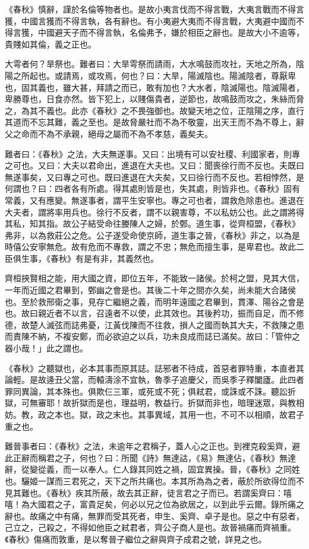 
《春秋》慎辭，謹於名倫等物者也。是故小夷言伐而不得言戰，大夷言戰而不得言獲，中國言獲而不得言執，各有辭也。有小夷避大夷而不得言戰，大夷避中國而不得言獲，中國避天子而不得言執，名倫弗予，嫌於相臣之辭也。是故大小不逾等，貴賤如其倫，義之正也。

大雩者何？旱祭也。難者曰：大旱雩祭而請雨，大水鳴鼓而攻社，天地之所為，陰陽之所起也。或請焉，或攻焉，何也？曰：大旱，陽滅陰也。陽滅陰者，尊厭卑也，固其義也，雖大甚，拜請之而已，敢有加也？大水者，陰滅陽也。陰滅陽者，卑勝尊也，日食亦然。皆下犯上，以賤傷貴者，逆節也，故鳴鼓而攻之，朱絲而脅之，為其不義也。此亦《春秋》之不畏強御也。故變天地之位，正陰陽之序，直行其道而不忘其難，義之至也。是故脅嚴社而不為不敬靈，出天王而不為不尊上，辭父之命而不為不承親，絕母之屬而不為不孝慈，義矣夫。


難者曰：《春秋》之法，大夫無遂事。又曰：出境有可以安社稷、利國家者，則專之可也。又曰：大夫以君命出，進退在大夫也。又曰：聞喪徐行而不反也。夫既曰無遂事矣，又曰專之可也。既曰進退在大夫矣，又曰徐行而不反也。若相悖然，是何謂也？曰：四者各有所處。得其處則皆是也，失其處，則皆非也。《春秋》固有常義，又有應變。無遂事者，謂平生安寧也。專之可也者，謂救危除患也。進退在大夫者，謂將率用兵也。徐行不反者，謂不以親害尊，不以私妨公也。此之謂將得其私，知其指。故公子結受命往媵陳人之婦，於鄄。道生事，從齊桓盟，《春秋》弗非，以為救莊公之危。公子遂受命使京師，道生事之晉，《春秋》非之，以為是時僖公安寧無危。故有危而不專救，謂之不忠；無危而擅生事，是卑君也。故此二臣俱生事，《春秋》有是有非，其義然也。


齊桓挾賢相之能，用大國之資，即位五年，不能致一諸侯。於柯之盟，見其大信，一年而近國之君畢到，鄄幽之會是也。其後二十年之間亦久矣，尚未能大合諸侯也。至於救邢衛之事，見存亡繼絕之義，而明年遠國之君畢到，貫澤、陽谷之會是也。故曰親近者不以言，召遠者不以使，此其效也。其後矜功，振而自足，而不修德，故楚人滅弦而誌弗憂，江黃伐陳而不往救，損人之國而執其大夫，不救陳之患而責陳不納，不複安鄭，而必欲迫之以兵，功未良成而誌已滿矣。故曰：「管仲之器小哉！」此之謂也。


《春秋》之聽獄也，必本其事而原其誌。誌邪者不待成，首惡者罪特重，本直者其論輕。是故逄丑父當，而轅濤涂不宜執，魯季子追慶父，而吳季子釋闔廬。此四者罪同異論，其本殊也。俱欺仨三軍，或死或不死；俱弒君，或誅或不誅。聽訟折獄，可無審耶！故折獄而是也，理益明，教益行。折獄而非也，暗理迷眾，與教相妨。教，政之本也。獄，政之末也。其事異域，其用一也，不可不以相順，故君子重之也。


難晉事者曰：《春秋》之法，未逾年之君稱子，蓋人心之正也。到裡克殺奚齊，避此正辭而稱君之子，何也？曰：所聞《詩》無達詁，《易》無達佔，《春秋》無達辭，從變從義，而一以奉人。仁人錄其同姓之禍，固宜異操。晉，《春秋》之同姓也。驪姬一謀而三君死之，天下之所共痛也。本其所為為之者，蔽於所欲得位而不見其難也。《春秋》疾其所蔽，故去其正辭，徒言君之子而已。若謂奚齊曰：嘻嘻！為大國君之子，富貴足矣，何必以兄之位為欲居之，以到此乎云爾。錄所痛之辭也。故痛之中有痛，無罪而受其死者，申生、奚齊、卓子是也。惡之中有惡者，己立之，己殺之，不得如他臣之弒君者，齊公子商人是也。故晉禍痛而齊禍重。《春秋》傷痛而敦重，是以奪晉子繼位之辭與齊子成君之號，詳見之也。


